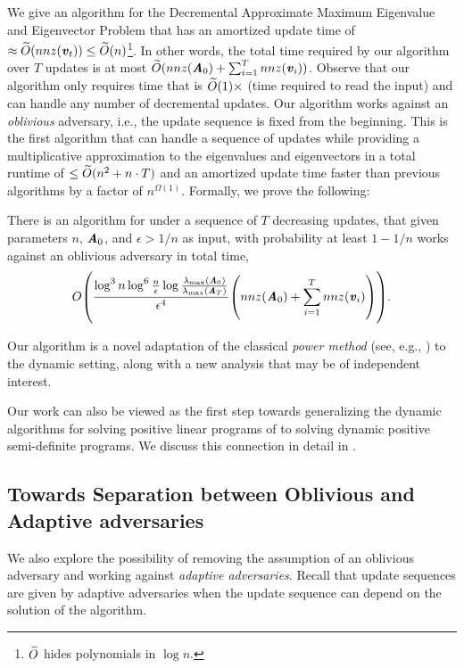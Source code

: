 We give an algorithm for the Decremental Approximate Maximum Eigenvalue and Eigenvector Problem that has an amortized update time of $\approx \Otil(nnz(\vv_t))\leq \Otil(n)$\footnote{$\Otil$ hides polynomials in $\log n$.}. In other words, the total time required by our algorithm over $T$ updates is at most $\Otil(nnz(\AA_0) + \sum_{i=1}^T nnz(\vv_i))$. Observe that our algorithm only requires time that is $\Otil(1) \times$ (time required to read the input) and can handle any number of decremental updates. Our algorithm works against an {\it oblivious} adversary, i.e., the update sequence is fixed from the beginning. This is the first algorithm that can handle a sequence of updates while providing a multiplicative approximation to the eigenvalues and eigenvectors in a total runtime of $\leq \Otil(n^2 + n\cdot T)$ and an amortized update time faster than previous algorithms by a factor of $n^{\Omega(1)}$. Formally, we prove the following:
\begin{theorem}
	\label{thm:upper}There is an algorithm for  under a sequence of $T$ decreasing updates, that given parameters $n$, $\AA_0$, and $\epsilon>1/n$ as input, with probability at least $1-1/n$ works against an oblivious adversary in total time,
 \[
 O\left(\frac{\log^{3}n \log^6 \frac{n}{\epsilon}\log \frac{\lambda_{\max}(\AA_0)}{\lambda_{\max}(\AA_T)}}{\epsilon^{4}}\left(nnz(\AA_0) + \sum_{i=1}^T nnz(\vv_i)\right) \right).
 \]
\end{theorem}

 Our algorithm is a novel adaptation of the classical {\it power method} (see, e.g., \cite{trefethen2022numerical}) 
 to the dynamic setting, along with a new analysis that may be of independent interest. 

 Our work can also be viewed as the first step towards generalizing the dynamic algorithms for solving positive linear programs of \cite{bhattacharya2023dynamic} to solving dynamic positive semi-definite programs. We discuss this connection in detail in .

\subsection{Towards Separation between Oblivious and Adaptive adversaries}
 We also explore the possibility of removing the assumption of an oblivious adversary and working against {\it adaptive adversaries}. Recall that update sequences are given by adaptive adversaries when the update sequence can depend on the solution of the algorithm. 
 
